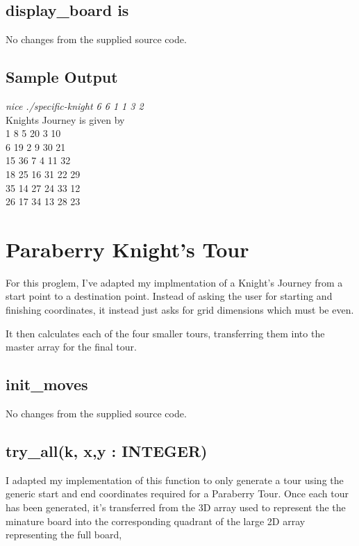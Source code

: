 \documentclass[a4paper,12pt]{article}
\begin{document}
\subsection{display\_board is}

No changes from the supplied source code.

\subsection{Sample Output}

\emph{nice ./specific-knight 6 6 1 1 3 2} \\

Knights Journey is given by \\

1 8 5 20 3 10 \\
6 19 2 9 30 21 \\
15 36 7 4 11 32 \\
18 25 16 31 22 29 \\
35 14 27 24 33 12 \\
26 17 34 13 28 23 \\
 
\section{Paraberry Knight's Tour}

For this proglem, I've adapted my implmentation of a Knight's Journey
from a start point to a destination point. Instead of asking the user
for starting and finishing coordinates, it instead just asks for grid
dimensions which must be even.


It then calculates each of the four smaller tours, transferring them
into the master array for the final tour.

\subsection{init\_moves}

No changes from the supplied source code.

\subsection{try\_all(k, x,y : INTEGER)}

I adapted my implementation of this function to only generate a tour
using the generic start and end coordinates required for a Paraberry
Tour. Once each tour has been generated, it's transferred from the 3D
array used to represent the the minature board into the corresponding 
quadrant of the large 2D array representing the full board, 
\end{document}
